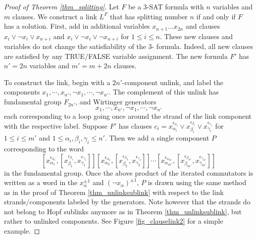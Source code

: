 \documentclass[12pt]{amsart}
\theoremstyle{definition}
\theoremstyle{remark}
\begin{document}
\begin{proof}[Proof of Theorem \ref{thm_splitting}]

Let $F$ be a 3-\textsc{SAT} formula with $n$ variables and $m$ clauses.
We construct a link $L^F$ that has splitting number $n$ if and only if $F$ has a solution.
First, add in additional variables $x_{n+1} \dots x_{2n}$ and clauses $x_i \vee \neg x_i \vee x_{n+i}$ and $x_i \vee \neg x_i \vee \neg x_{n+i}$ for $1 \le i \le n$.
These new clauses and variables do not change the satisfiability of the 3- formula.
Indeed, all new clauses are satisfied by any TRUE/FALSE variable assignment.
The new formula $F'$ has $n' = 2n$ variables and $m' = m+2n$ clauses.

To construct the link, begin with a $2n'$-component unlink, and label the components $x_1, \cdots, x_{n'}, \neg x_1, \cdots , \neg x_{n'}$.
The complement of this unlink has fundamental group $F_{2n'}$, and Wirtinger generators $$x_1, \cdots, x_{n'}, \neg x_1, \cdots , \neg x_{n'}$$ each corresponding to a loop going once around the strand of the link component with the respective label.
Suppose $F'$ has clauses $c_i =  x_{\alpha_i}^{\epsilon_{\alpha_i}} \vee x_{\beta_i}^{\epsilon_{\beta_i}} \vee x_{\gamma_i}^{\epsilon_{\gamma_i}}$ for $1 \le i \le m'$ and $1 \le \alpha_i,\beta_i,\gamma_i \le n'$.
Then we add a single component $P$ corresponding to the word
$$[x_{\alpha_1}^{\epsilon_{\alpha_1}}, [ x_{\beta_1}^{\epsilon_{\beta_1}}, x_{\gamma_1}^{\epsilon_{\gamma_1}}]][x_{\alpha_2}^{\epsilon_{\alpha_2}}, [ x_{\beta_2}^{\epsilon_{\beta_2}}, x_{\gamma_2}^{\epsilon_{\gamma_2}}]] \cdots [x_{\alpha_{m'}}^{\epsilon_{\alpha_{m'}}}, [ x_{\beta_{m'}}^{\epsilon_{\beta_{m'}}}, x_{\gamma_{m'}}^{\epsilon_{\gamma_{m'}}}]]$$
in the fundamental group.
Once the above product of the iterated commutators is written as a word in the $x_\alpha^{\pm 1}$ and $(\neg x_\alpha)^{\pm 1}$, $P$ is drawn using the same method as in the proof of Theorem \ref{thm_unlinksublink} with respect to the link strands/components labeled by the generators.
Note however that the strands do not belong to Hopf sublinks anymore as in Theorem \ref{thm_unlinksublink}, but rather to unlinked components.
See Figure \ref{fig_clauselink2} for a simple example.


\end{proof}
\end{document}
